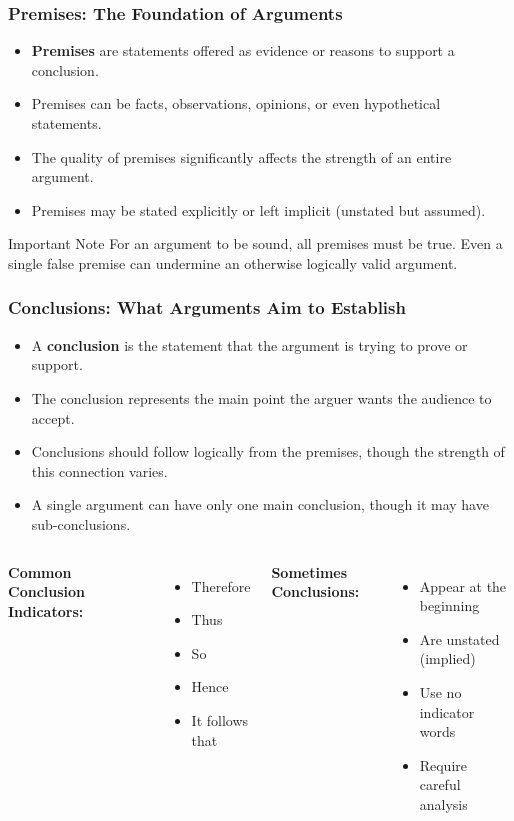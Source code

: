 \documentclass{beamer}
\begin{document}
\begin{frame}
    \frametitle{Premises: The Foundation of Arguments}
    \begin{itemize}
        \item \textbf{Premises} are statements offered as evidence or reasons to support a conclusion.
        \item Premises can be facts, observations, opinions, or even hypothetical statements.
        \item The quality of premises significantly affects the strength of an entire argument.
        \item Premises may be stated explicitly or left implicit (unstated but assumed).
    \end{itemize}
    
    \begin{alertblock}{Important Note}
        For an argument to be sound, all premises must be true. Even a single false premise can undermine an otherwise logically valid argument.
    \end{alertblock}
\end{frame}

\begin{frame}
    \frametitle{Conclusions: What Arguments Aim to Establish}
    \begin{itemize}
        \item A \textbf{conclusion} is the statement that the argument is trying to prove or support.
        \item The conclusion represents the main point the arguer wants the audience to accept.
        \item Conclusions should follow logically from the premises, though the strength of this connection varies.
        \item A single argument can have only one main conclusion, though it may have sub-conclusions.
    \end{itemize}
    
    \begin{columns}[t]
        \textbf{Common Conclusion Indicators:}
        \begin{itemize}
            \item Therefore
            \item Thus
            \item So
            \item Hence
            \item It follows that
        \end{itemize}
        
        \textbf{Sometimes Conclusions:}
        \begin{itemize}
            \item Appear at the beginning
            \item Are unstated (implied)
            \item Use no indicator words
            \item Require careful analysis
        \end{itemize}
    \end{columns}
\end{frame}
\end{document}
